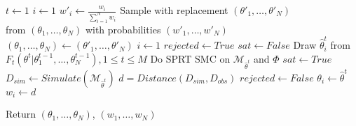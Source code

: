 \begin{algorithm}
      \begin{algorithmic}[H]
            \State $t \leftarrow 1$
            \State $i \leftarrow 1$ 
            \State $w'_i \leftarrow \frac{w_i}{\sum_{i=1}^N w_i} $
            \EndWhile
            \State Sample with replacement $(\theta'_1,\ldots,\theta'_N)$  \\\hspace{1.5cm} from $(\theta_1,\ldots,\theta_N)$ with probabilities $(w'_1,\ldots,w'_N)$
            \State $(\theta_1,\ldots,\theta_N) \leftarrow (\theta'_1,\ldots,\theta'_N)$
            \State $i \leftarrow 1$
             
            \State $rejected \leftarrow True$
            \State $sat \leftarrow False $
            \State Draw $\hat{\theta}^t_i$ from $F_t(\theta^t | \theta^{t-1}_1,\ldots,\theta^{t-1}_N), 1\leq t \leq M$
            \State Do SPRT SMC on $\mathcal{M}_{\hat{\theta}^t}$ and $\Phi$
            \State $sat \leftarrow True$
            \EndIf
            \EndWhile
            \State $D_{sim} \leftarrow Simulate(\mathcal{M}_{\hat{\theta}^t})$
            \State $d = Distance(D_{sim}, D_{obs})$
            \State $rejected \leftarrow False$
            \State $\theta_i \leftarrow \hat{\theta}^t$
            \State $w_i \leftarrow d$
            \EndIf

            \EndWhile
            \EndWhile
            \EndWhile
            \State Return $(\theta_1,\ldots,\theta_{N})$, $(w_1,\ldots,w_{N})$
            \EndProcedure
      \end{algorithmic}
\end{algorithm}

